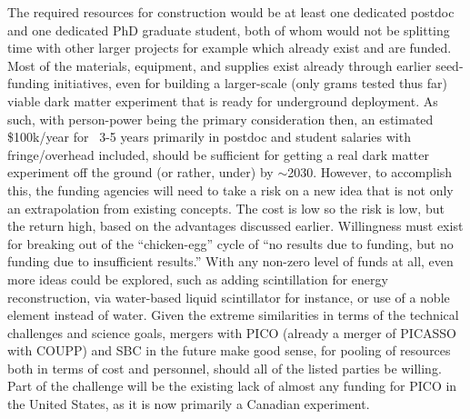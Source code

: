 The required resources for construction would be at least one dedicated postdoc and one dedicated PhD graduate student, both of whom would not be splitting time with other larger projects for example which already exist and are funded. Most of the materials, equipment, and supplies exist already through earlier seed-funding initiatives, even for building a larger-scale (only grams tested thus far) viable dark matter experiment that is ready for underground deployment. As such, with person-power being the primary consideration then, an estimated \$100k/year for ~3-5 years primarily in postdoc and student salaries with fringe/overhead included, should be sufficient for getting a real dark matter experiment off the ground (or rather, under) by $\sim$2030. However, to accomplish this, the funding agencies will need to take a risk on a new idea that is not only an extrapolation from existing concepts. The cost is low so the risk is low, but the return high, based on the advantages discussed earlier. Willingness must exist for breaking out of the “chicken-egg” cycle of “no results due to funding, but no funding due to insufficient results.” With any non-zero level of funds at all, even more ideas could be explored, such as adding scintillation for energy reconstruction, via water-based liquid scintillator for instance, or use of a noble element instead of water. Given the extreme similarities in terms of the technical challenges and science goals, mergers with PICO (already a merger of PICASSO with COUPP) and SBC in the future make good sense, for pooling of resources both in terms of cost and personnel, should all of the listed parties be willing. Part of the challenge will be the existing lack of almost any funding for PICO in the United States, as it is now primarily a Canadian experiment.


